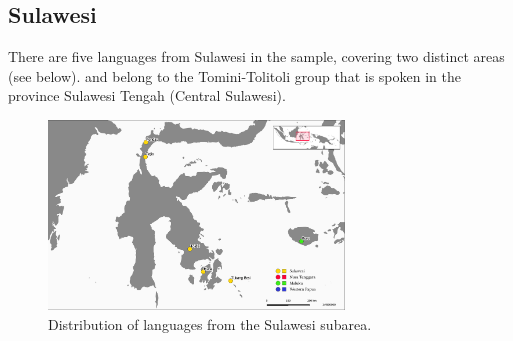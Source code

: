 \subsection{Sulawesi}

There are five languages from Sulawesi in the sample, covering two distinct areas (see  below).  and  belong to the Tomini-Tolitoli group that is spoken in the province Sulawesi Tengah (Central Sulawesi). 

\begin{figure}
\includegraphics[width=0.7\textwidth]{figures/languages_Sulawesi.pdf}
\caption{Distribution of languages from the Sulawesi subarea.}\label{map:Sul}

\end{figure}

